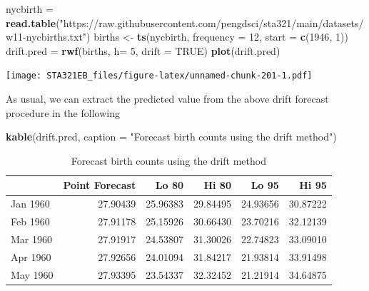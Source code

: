 \documentclass[
]{book}
\newenvironment{Shaded}{\begin{snugshade}}{\end{snugshade}}
\newcommand{\AttributeTok}[1]{\textcolor[rgb]{0.13,0.29,0.53}{#1}}
\newcommand{\ConstantTok}[1]{\textcolor[rgb]{0.56,0.35,0.01}{#1}}
\newcommand{\DecValTok}[1]{\textcolor[rgb]{0.00,0.00,0.81}{#1}}
\newcommand{\FunctionTok}[1]{\textcolor[rgb]{0.13,0.29,0.53}{\textbf{#1}}}
\newcommand{\NormalTok}[1]{#1}
\newcommand{\OtherTok}[1]{\textcolor[rgb]{0.56,0.35,0.01}{#1}}
\newcommand{\StringTok}[1]{\textcolor[rgb]{0.31,0.60,0.02}{#1}}
\begin{document}
\begin{Shaded}
\begin{Highlighting}[]
\NormalTok{nycbirth }\OtherTok{=} \FunctionTok{read.table}\NormalTok{(}\StringTok{"https://raw.githubusercontent.com/pengdsci/sta321/main/datasets/w11{-}nycbirths.txt"}\NormalTok{)}
\NormalTok{births }\OtherTok{\textless{}{-}} \FunctionTok{ts}\NormalTok{(nycbirth, }\AttributeTok{frequency =} \DecValTok{12}\NormalTok{, }\AttributeTok{start =} \FunctionTok{c}\NormalTok{(}\DecValTok{1946}\NormalTok{, }\DecValTok{1}\NormalTok{))}
\NormalTok{drift.pred }\OtherTok{=} \FunctionTok{rwf}\NormalTok{(births, }\AttributeTok{h=} \DecValTok{5}\NormalTok{, }\AttributeTok{drift =} \ConstantTok{TRUE}\NormalTok{)}
\FunctionTok{plot}\NormalTok{(drift.pred)}
\end{Highlighting}
\end{Shaded}

\texttt{[image: STA321EB\_files/figure-latex/unnamed-chunk-201-1.pdf]}

As usual, we can extract the predicted value from the above drift forecast procedure in the following

\begin{Shaded}
\begin{Highlighting}[]
\FunctionTok{kable}\NormalTok{(drift.pred, }\AttributeTok{caption =} \StringTok{"Forecast birth counts using the drift method"}\NormalTok{)}
\end{Highlighting}
\end{Shaded}

\begin{table}

\caption{\label{tab:unnamed-chunk-202}Forecast birth counts using the drift method}
\centering
\begin{tabular}[t]{l|r|r|r|r|r}
\hline
  & Point Forecast & Lo 80 & Hi 80 & Lo 95 & Hi 95\\
\hline
Jan 1960 & 27.90439 & 25.96383 & 29.84495 & 24.93656 & 30.87222\\
\hline
Feb 1960 & 27.91178 & 25.15926 & 30.66430 & 23.70216 & 32.12139\\
\hline
Mar 1960 & 27.91917 & 24.53807 & 31.30026 & 22.74823 & 33.09010\\
\hline
Apr 1960 & 27.92656 & 24.01094 & 31.84217 & 21.93814 & 33.91498\\
\hline
May 1960 & 27.93395 & 23.54337 & 32.32452 & 21.21914 & 34.64875\\
\hline
\end{tabular}
\end{table}
\end{document}
